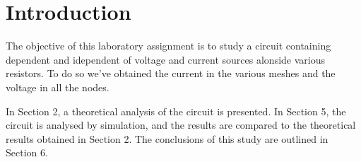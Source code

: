 \newpage
\section{Introduction}
\label{sec:introduction}
The objective of this laboratory assignment is to study a circuit containing dependent and idependent of voltage and current sources alonside various resistors. To do so we've obtained the current in the various meshes and the voltage in all the nodes.

In Section 2, a theoretical analysis of the circuit is presented. In Section 5, the circuit is
analysed by simulation, and the results are compared to the theoretical results obtained in
Section 2. The conclusions of this study are outlined in Section 6. 
